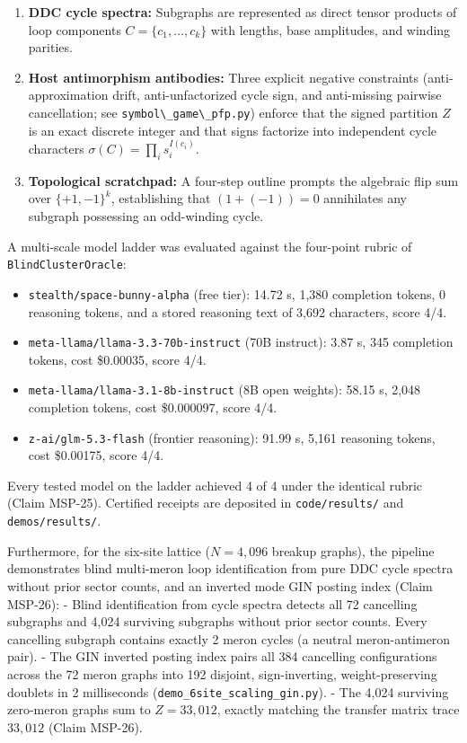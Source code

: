 \documentclass[
  11pt,
]{article}
\newcommand{\passthrough}[1]{#1}
\providecommand{\tightlist}{%
  \setlength{\itemsep}{0pt}\setlength{\parskip}{0pt}}
\begin{document}
\begin{enumerate}
\def\labelenumi{\arabic{enumi}.}
\tightlist
\item
  \textbf{DDC cycle spectra:} Subgraphs are represented as direct tensor
  products of loop components \(C = \{c_1, \dots, c_k\}\) with lengths,
  base amplitudes, and winding parities.
\item
  \textbf{Host antimorphism antibodies:} Three explicit negative
  constraints (anti-approximation drift, anti-unfactorized cycle sign,
  and anti-missing pairwise cancellation; see
  \passthrough{\lstinline!symbol\_game\_pfp.py!}) enforce that the
  signed partition \(Z\) is an exact discrete integer and that signs
  factorize into independent cycle characters
  \(\sigma(C) = \prod_i s_i^{I(c_i)}\).
\item
  \textbf{Topological scratchpad:} A four-step outline prompts the
  algebraic flip sum over \(\{+1, -1\}^k\), establishing that
  \((1 + (-1)) = 0\) annihilates any subgraph possessing an odd-winding
  cycle.
\end{enumerate}

A multi-scale model ladder was evaluated against the four-point rubric
of \passthrough{\lstinline!BlindClusterOracle!}:

\begin{itemize}
\tightlist
\item
  \nolinkurl{stealth/space-bunny-alpha} (free tier): 14.72 s, 1,380
  completion tokens, 0 reasoning tokens, and a stored reasoning text of
  3,692 characters, score 4/4.
\item
  \nolinkurl{meta-llama/llama-3.3-70b-instruct} (70B instruct): 3.87 s,
  345 completion tokens, cost \$0.00035, score 4/4.
\item
  \nolinkurl{meta-llama/llama-3.1-8b-instruct} (8B open weights): 58.15
  s, 2,048 completion tokens, cost \$0.000097, score 4/4.
\item
  \passthrough{\lstinline!z-ai/glm-5.3-flash!} (frontier reasoning):
  91.99 s, 5,161 reasoning tokens, cost \$0.00175, score 4/4.
\end{itemize}

Every tested model on the ladder achieved 4 of 4 under the identical
rubric (Claim MSP-25). Certified receipts are deposited in
\passthrough{\lstinline!code/results/!} and
\passthrough{\lstinline!demos/results/!}.

Furthermore, for the six-site lattice (\(N = 4{,}096\) breakup graphs),
the pipeline demonstrates blind multi-meron loop identification from
pure DDC cycle spectra without prior sector counts, and an inverted mode
GIN posting index (Claim MSP-26): - Blind identification from cycle
spectra detects all 72 cancelling subgraphs and 4,024 surviving
subgraphs without prior sector counts. Every cancelling subgraph
contains exactly 2 meron cycles (a neutral meron-antimeron pair). - The
GIN inverted posting index pairs all 384 cancelling configurations
across the 72 meron graphs into 192 disjoint, sign-inverting,
weight-preserving doublets in 2 milliseconds
(\nolinkurl{demo_6site_scaling_gin.py}). - The 4,024 surviving
zero-meron graphs sum to \(Z = 33{,}012\), exactly matching the transfer
matrix trace \(33{,}012\) (Claim MSP-26).
\end{document}
